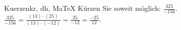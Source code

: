 \begin{MAufgabe}{Kuerzen}{kr, dh, MaTeX}
K\"urzen Sie soweit m\"oglich: $\frac{325}{-156}$.\\ 
\ifLsg\MLoesung
\quad $\frac{325}{-156}=\frac{(13)\cdot(25)}{(13)\cdot(-12)}=\frac{25}{-12}=\frac{-25}{12}$.\else\relax\fi
 \end{MAufgabe}